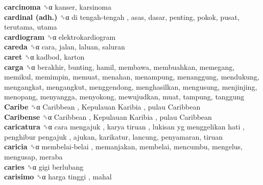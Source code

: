 \textbf{carcinoma} ␝α  kanser, karsinoma  \\
\textbf{cardinal (adh.)} ␝α   di tengah-tengah , asas, dasar, penting, pokok, pusat, terutama, utama  \\
\textbf{cardiogram} ␝α  elektrokardiogram  \\
\textbf{careda} ␝α  cara, jalan, laluan, saluran  \\
\textbf{caret} ␝α  kadbod, karton  \\
\textbf{carga} ␝α  berakhir, bunting, hamil, membawa, membuahkan, memegang, memikul, memimpin, memuat, menahan, menampung, menanggung, mendukung, mengangkat, mengangkut, menggendong, menghasilkan, mengusung, menjinjing, menopang, menyangga, menyokong, mewujudkan, muat, tampung, tanggung  \\
\textbf{Caribe} ␝α   Caribbean ,  Kepulauan Karibia ,  pulau Caribbean   \\
\textbf{Caribense} ␝α   Caribbean ,  Kepulauan Karibia ,  pulau Caribbean   \\
\textbf{caricatura} ␝α   cara mengajuk ,  karya tiruan ,  lukisan yg menggelikan hati ,  penghibur pengajuk , ajukan, karikatur, lancung, penyamaran, tiruan  \\
\textbf{caricia} ␝α   membelai-belai , memanjakan, membelai, mencumbu, mengelus, mengusap, meraba  \\
\textbf{caries} ␝α   gigi berlubang   \\
\textbf{carisimo} ␝α   harga tinggi , mahal  \\

